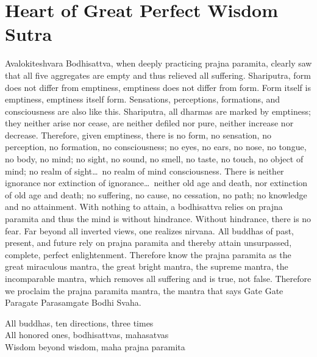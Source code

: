 \documentclass{chant-card}
\begin{document}
\fontsize{15pt}{20pt}\selectfont

\section{Heart of Great Perfect Wisdom Sutra}

Avalokiteshvara Bodhisattva, when deeply practicing prajna paramita, clearly
saw that all five aggregates are empty and thus relieved all suffering.
Shariputra, form does not differ from emptiness, emptiness does not differ from
form. Form itself is emptiness, emptiness itself form. Sensations, perceptions,
formations, and consciousness are also like this. Shariputra, all dharmas are
marked by emptiness; they neither arise nor cease, are neither defiled nor pure,
neither increase nor decrease. Therefore, given emptiness, there is no form, no
sensation, no perception, no formation, no consciousness; no eyes, no ears, no
nose, no tongue, no body, no mind; no sight, no sound, no smell, no taste, no
touch, no object of mind; no realm of sight\dots\ no realm of mind
consciousness. There is neither ignorance nor extinction of ignorance\dots\
neither old age and death, nor extinction of old age and death; no suffering, no
cause, no cessation, no path; no knowledge and no attainment.  With nothing to
attain, a bodhisattva relies on prajna paramita and thus the mind is without
hindrance. Without hindrance, there is no fear.  Far beyond all inverted views,
one realizes nirvana. All buddhas of past, present, and future rely on prajna
paramita and thereby attain unsurpassed, complete, perfect enlightenment.
Therefore know the prajna paramita as the great miraculous mantra, the great
bright mantra, the supreme mantra, the incomparable mantra, which removes all
suffering and is true, not false.  Therefore we proclaim the prajna paramita
mantra, the mantra that says Gate Gate Paragate Parasamgate Bodhi Svaha.

\begin{center}
  All buddhas, ten directions, three times\\
  All honored ones, bodhisattvas, mahasatvas\\
  Wisdom beyond wisdom, maha prajna paramita
\end{center}
\end{document}
